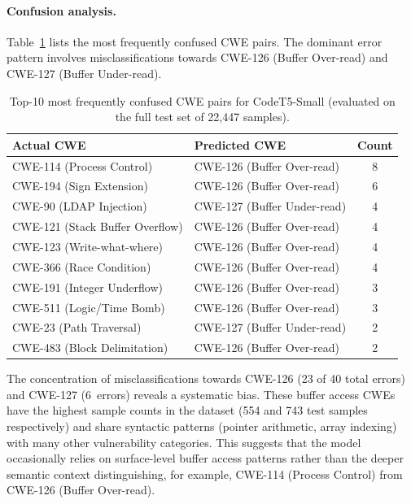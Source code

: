 \documentclass[conference]{IEEEtran}
\begin{document}
\paragraph{Confusion analysis.}
Table~\ref{tab:confusion_pairs} lists the most frequently confused CWE
pairs.  The dominant error pattern involves misclassifications towards
CWE-126 (Buffer Over-read) and CWE-127 (Buffer Under-read).

\begin{table}[!t]
\centering
\caption{Top-10 most frequently confused CWE pairs for CodeT5-Small (evaluated on the full test set of 22,447 samples).}
\label{tab:confusion_pairs}
\scriptsize
\setlength{\tabcolsep}{3pt}
\renewcommand{\arraystretch}{1.08}
\begin{tabular}{>{\RaggedRight\arraybackslash}p{3.6cm}
                >{\RaggedRight\arraybackslash}p{3.2cm}
                c}
\toprule
\textbf{Actual CWE} & \textbf{Predicted CWE} & \textbf{Count} \\
\midrule
CWE-114 (Process Control)       & CWE-126 (Buffer Over-read)  & 8 \\
CWE-194 (Sign Extension)        & CWE-126 (Buffer Over-read)  & 6 \\
CWE-90 (LDAP Injection)         & CWE-127 (Buffer Under-read) & 4 \\
CWE-121 (Stack Buffer Overflow) & CWE-126 (Buffer Over-read)  & 4 \\
CWE-123 (Write-what-where)      & CWE-126 (Buffer Over-read)  & 4 \\
CWE-366 (Race Condition)        & CWE-126 (Buffer Over-read)  & 4 \\
CWE-191 (Integer Underflow)     & CWE-126 (Buffer Over-read)  & 3 \\
CWE-511 (Logic/Time Bomb)       & CWE-126 (Buffer Over-read)  & 3 \\
CWE-23 (Path Traversal)         & CWE-127 (Buffer Under-read) & 2 \\
CWE-483 (Block Delimitation)    & CWE-126 (Buffer Over-read)  & 2 \\
\bottomrule
\end{tabular}
\end{table}

The concentration of misclassifications towards CWE-126 (23 of 40 total
errors) and CWE-127 (6~errors) reveals a systematic bias.  These buffer
access CWEs have the highest sample counts in the dataset (554 and 743 test
samples respectively) and share syntactic patterns (pointer arithmetic,
array indexing) with many other vulnerability categories.  This suggests
that the model occasionally relies on surface-level buffer access patterns
rather than the deeper semantic context distinguishing, for example,
CWE-114 (Process Control) from CWE-126 (Buffer Over-read).
\end{document}
